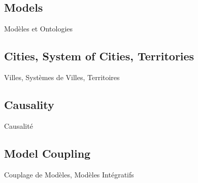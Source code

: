 \subsection*{Models}{Modèles et Ontologies}



\subsection*{Cities, System of Cities, Territories}{Villes, Systèmes de Villes, Territoires}




\subsection*{Causality}{Causalité}



\subsection*{Model Coupling}{Couplage de Modèles, Modèles Intégratifs}











